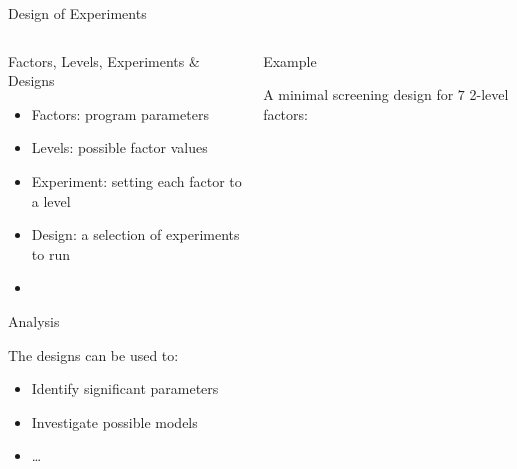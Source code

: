 \documentclass[10pt, compress, aspectratio=169, xcolor={table,usenames,dvipsnames}]{beamer}
\begin{document}
\begin{frame}[label={sec:orgf3db081}]{Design of Experiments}
\begin{columns}
\begin{column}{0.5\columnwidth}
\begin{block}{Factors, Levels, Experiments \& Designs}
\vspace{.2cm}

\begin{itemize}
\item \alert{Factors}: program \alert{parameters}
\item \alert{Levels}: possible factor \alert{values}
\item \alert{Experiment}: setting each factor to a level
\item \alert{Design}: a \alert{selection} of experiments to \alert{run}
\item {}
\end{itemize}

\begin{block}{Analysis}
\vspace{.2cm}

The \alert{designs} can be used to:

\begin{itemize}
\item \alert{Identify} significant parameters
\item \alert{Investigate} possible models
\item \dots{}
\end{itemize}
\end{block}
\end{block}
\end{column}

\begin{column}{0.5\columnwidth}
\begin{block}{Example}
\vspace{-.2cm}
\begin{center}

A \alert{minimal screening design} for \(7\) \alert{2-level factors}:

\end{center}
\vspace{-.2cm}


\vspace{-.2cm}

\end{block}
\end{column}
\end{columns}
\end{frame}
\end{document}
